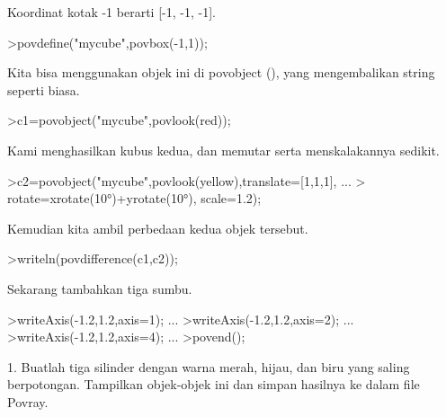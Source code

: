 \documentclass{article}
\begin{document}
\begin{eulernotebook}
\begin{eulercomment}
\begin{eulercomment}
\begin{eulercomment}
\begin{eulercomment}
\begin{eulercomment}
\begin{eulercomment}
\begin{eulercomment}
\begin{eulercomment}
\begin{eulercomment}
\begin{eulercomment}
\begin{eulercomment}
\begin{eulercomment}
\begin{eulercomment}
\begin{eulercomment}
\begin{eulercomment}
\begin{eulercomment}
\begin{eulercomment}
\begin{eulercomment}
\begin{eulercomment}
\begin{eulercomment}
\begin{eulercomment}
\begin{eulercomment}
\begin{eulercomment}
\begin{eulercomment}
\begin{eulercomment}
Koordinat kotak -1 berarti [-1, -1, -1].
\end{eulercomment}
\begin{eulerprompt}
>povdefine("mycube",povbox(-1,1));
\end{eulerprompt}
\begin{eulercomment}
Kita bisa menggunakan objek ini di povobject (), yang mengembalikan
string seperti biasa.
\end{eulercomment}
\begin{eulerprompt}
>c1=povobject("mycube",povlook(red));
\end{eulerprompt}
\begin{eulercomment}
Kami menghasilkan kubus kedua, dan memutar serta menskalakannya
sedikit.
\end{eulercomment}
\begin{eulerprompt}
>c2=povobject("mycube",povlook(yellow),translate=[1,1,1], ...
>  rotate=xrotate(10°)+yrotate(10°), scale=1.2);
\end{eulerprompt}
\begin{eulercomment}
Kemudian kita ambil perbedaan kedua objek tersebut.
\end{eulercomment}
\begin{eulerprompt}
>writeln(povdifference(c1,c2));
\end{eulerprompt}
\begin{eulercomment}
Sekarang tambahkan tiga sumbu.
\end{eulercomment}
\begin{eulerprompt}
>writeAxis(-1.2,1.2,axis=1); ...
>writeAxis(-1.2,1.2,axis=2); ...
>writeAxis(-1.2,1.2,axis=4); ...
>povend();
\end{eulerprompt}
\eulersubheading{}
\begin{eulercomment}
\end{eulercomment}
\begin{eulercomment}
1. Buatlah tiga silinder dengan warna merah, hijau, dan biru yang
saling berpotongan. Tampilkan objek-objek ini dan simpan hasilnya ke
dalam file Povray.


\end{eulercomment}
\end{eulercomment}
\end{eulercomment}
\end{eulercomment}
\end{eulercomment}
\end{eulercomment}
\end{eulercomment}
\end{eulercomment}
\end{eulercomment}
\end{eulercomment}
\end{eulercomment}
\end{eulercomment}
\end{eulercomment}
\end{eulercomment}
\end{eulercomment}
\end{eulercomment}
\end{eulercomment}
\end{eulercomment}
\end{eulercomment}
\end{eulercomment}
\end{eulercomment}
\end{eulercomment}
\end{eulercomment}
\end{eulercomment}
\end{eulercomment}
\end{eulernotebook}
\end{document}
